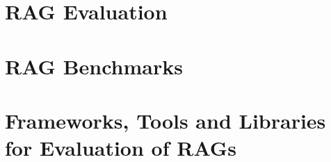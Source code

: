 \section{RAG Evaluation}

\section{RAG Benchmarks}

\section{Frameworks, Tools and Libraries for Evaluation of RAGs}

